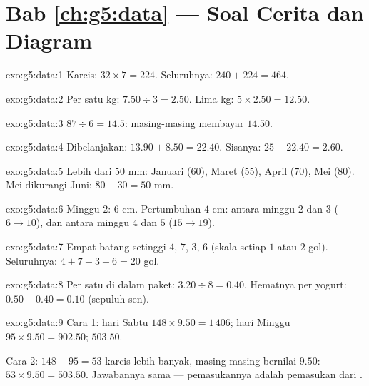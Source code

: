 \section*{Bab \ref{ch:g5:data} --- Soal Cerita dan Diagram}

\begin{solution}{exo:g5:data:1}
Karcis: $32 \times 7 = 224$. Seluruhnya: $240 + 224 = 464$.
\end{solution}

\begin{solution}{exo:g5:data:2}
Per satu kg: $7.50 \div 3 = 2.50$. Lima kg:
$5 \times 2.50 = 12.50$.
\end{solution}

\begin{solution}{exo:g5:data:3}
$87 \div 6 = 14.5$: masing-masing membayar $14.50$.
\end{solution}

\begin{solution}{exo:g5:data:4}
Dibelanjakan: $13.90 + 8.50 = 22.40$. Sisanya: $25 - 22.40 = 2.60$.
\end{solution}

\begin{solution}{exo:g5:data:5}
Lebih dari $50$ mm: Januari ($60$), Maret ($55$), April ($70$), Mei
($80$). Mei dikurangi Juni: $80 - 30 = 50$ mm.
\end{solution}

\begin{solution}{exo:g5:data:6}
Minggu $2$: $6$ cm. Pertumbuhan $4$ cm: antara minggu $2$ dan $3$
($6 \to 10$), dan antara minggu $4$ dan $5$ ($15 \to 19$).
\end{solution}

\begin{solution}{exo:g5:data:7}
Empat batang setinggi $4$, $7$, $3$, $6$ (skala setiap $1$ atau
$2$ gol). Seluruhnya: $4 + 7 + 3 + 6 = 20$ gol.
\end{solution}

\begin{solution}{exo:g5:data:8}
Per satu di dalam paket: $3.20 \div 8 = 0.40$. Hematnya per yogurt:
$0.50 - 0.40 = 0.10$ (sepuluh sen).
\end{solution}

\begin{solution}{exo:g5:data:9}
Cara 1: hari Sabtu $148 \times 9.50 = 1\,406$; hari Minggu
$95 \times 9.50 = 902.50$;  $503.50$.

Cara 2: $148 - 95 = 53$ karcis lebih banyak, masing-masing bernilai
$9.50$: $53 \times 9.50 = 503.50$. Jawabannya sama --- 
pemasukannya adalah pemasukan dari .
\end{solution}


